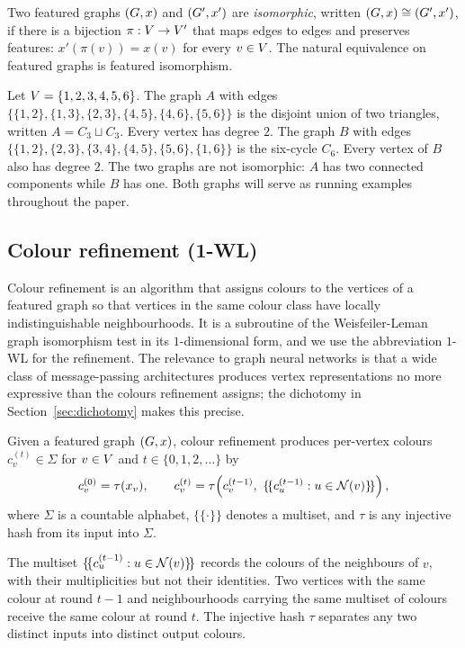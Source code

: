 Two featured graphs $(G, x)$ and $(G', x')$ are
\emph{isomorphic}, written $(G, x) \cong (G', x')$, if there is
a bijection $\pi : V \to V'$ that maps edges to edges
and preserves features: $x'(\pi(v)) = x(v)$ for every $v \in
V$. The natural equivalence on featured graphs is featured
isomorphism.

\begin{example}\label{ex:graphs}
Let $V = \{1, 2, 3, 4, 5, 6\}$. The graph $A$ with edges
$\{\{1,2\}, \{1,3\}, \{2,3\}, \{4,5\}, \{4,6\}, \{5,6\}\}$ is the
disjoint union of two triangles, written $A = C_3 \sqcup C_3$. Every
vertex has degree $2$. The graph $B$ with edges $\{\{1,2\}, \{2,3\},
\{3,4\}, \{4,5\}, \{5,6\}, \{1,6\}\}$ is the six-cycle $C_6$. Every
vertex of $B$ also has degree $2$. The two graphs are not isomorphic:
$A$ has two connected components while $B$ has one. Both graphs will
serve as running examples throughout the paper.
\end{example}

\subsection{Colour refinement (1-WL)}\label{sec:wl}

Colour refinement is an algorithm that assigns colours to the vertices
of a featured graph so that vertices in the same colour class have
locally indistinguishable neighbourhoods. It is a subroutine of the
Weisfeiler-Leman graph isomorphism test in its $1$-dimensional form,
and we use the abbreviation $1$-WL for the refinement. The relevance
to graph neural networks is that a wide class of message-passing
architectures produces vertex representations no more expressive than
the colours refinement assigns; the dichotomy in
Section~\ref{sec:dichotomy} makes this precise.

\begin{definition}\label{def:wl}
Given a featured graph $(G, x)$, colour refinement produces
per-vertex colours $c_v^{(t)} \in \Sigma$ for $v \in V$ and
$t \in \{0, 1, 2, \dots\}$ by
\[
c_v^{(0)} = \tau(x_v),
\qquad
c_v^{(t)} = \tau\!\left(c_v^{(t-1)},\ \{\!\{c_u^{(t-1)} : u \in
\mathcal{N}(v)\}\!\}\right),
\]
where $\Sigma$ is a countable alphabet, $\{\!\{\cdot\}\!\}$ denotes a
multiset, and $\tau$ is any injective hash from its input into
$\Sigma$.
\end{definition}

The multiset $\{\!\{c_u^{(t-1)} : u \in \mathcal{N}(v)\}\!\}$ records the
colours of the neighbours of $v$, with their multiplicities but not
their identities. Two vertices with the same colour at round $t-1$
and neighbourhoods carrying the same multiset of colours receive the
same colour at round $t$. The injective hash $\tau$ separates any two
distinct inputs into distinct output colours.


